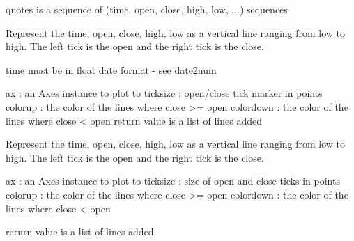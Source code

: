 \documentclass[letterpaper,10pt,english]{sphinxmanual}
\begin{document}
\begin{fulllineitems}
\label{newfinance:newfinance.plot_day_summary}
quotes is a sequence of (time, open, close, high, low, ...) sequences

Represent the time, open, close, high, low as a vertical line
ranging from low to high.  The left tick is the open and the right
tick is the close.

time must be in float date format - see date2num

ax          : an Axes instance to plot to
ticksize    : open/close tick marker in points
colorup     : the color of the lines where close \textgreater{}= open
colordown   : the color of the lines where close \textless{}  open
return value is a list of lines added

\end{fulllineitems}


\begin{fulllineitems}
\label{newfinance:newfinance.plot_day_summary2}
Represent the time, open, close, high, low as a vertical line
ranging from low to high.  The left tick is the open and the right
tick is the close.

ax          : an Axes instance to plot to
ticksize    : size of open and close ticks in points
colorup     : the color of the lines where close \textgreater{}= open
colordown   : the color of the lines where close \textless{}  open

return value is a list of lines added

\end{fulllineitems}

\end{document}
